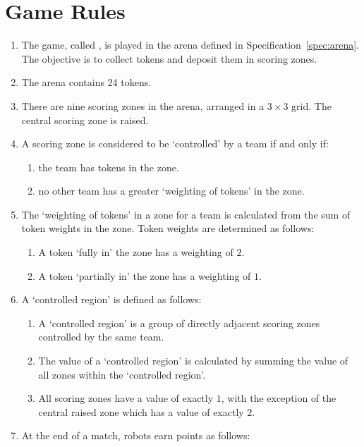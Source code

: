 \section{Game Rules}
\label{sec:rules}

\begin{enumerate}
  \item The game, called \emph{\gamename}, is played in the arena defined in
        Specification~\ref{spec:arena}. The objective is to collect tokens and
        deposit them in scoring zones.
  \item The arena contains 24 tokens.
  \item There are nine scoring zones in the arena, arranged in a $3\times3$
        grid. The central scoring zone is raised.
  \item A scoring zone is considered to be `controlled' by a team if and only if:
    \begin{enumerate}
      \item the team has tokens in the zone.
      \item no other team has a greater `weighting of tokens' in the zone.
    \end{enumerate}
  \item The `weighting of tokens' in a zone for a team is calculated from the sum of token weights in the zone.
      Token weights are determined as follows:
      \begin{enumerate}
            \item A token `fully in' the zone has a weighting of $2$.
            \item A token `partially in' the zone has a weighting of $1$.
    \end{enumerate}
  \item A `controlled region' is defined as follows:
    \begin{enumerate}
      \item A `controlled region' is a group of directly adjacent scoring zones controlled by the same team.
      \item The value of a `controlled region' is calculated by summing the value of all zones within the `controlled region'.
  \item All scoring zones have a value of exactly $1$, with the exception of the central raised zone which has a value of exactly $2$.
    \end{enumerate}
  \item At the end of a match, robots earn points as follows:
    \begin{enumerate}

\end{enumerate}
\end{enumerate}

